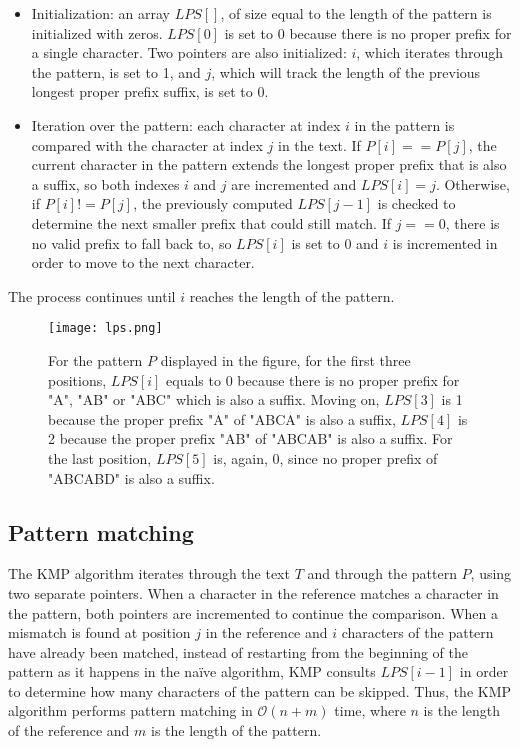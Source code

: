 \begin{itemize}
\item Initialization: an array \( LPS[] \), of size equal to the length of the pattern is initialized with zeros. \( LPS[0] \) is set to 0 because there is no proper prefix for a single character. Two pointers are also initialized: \( i \), which iterates through the pattern, is set to 1, and \( j \), which will track the length of the previous longest proper prefix suffix, is set to 0.
\item Iteration over the pattern: each character at index \( i \) in the pattern is compared with the character at index \( j \) in the text. If \( P[i] == P[j] \), the current character in the pattern extends the longest proper prefix that is also a suffix, so both indexes \( i \) and \( j \) are incremented and \( LPS[i] = j\). Otherwise, if \( P[i] != P[j] \), the previously computed \( LPS[j-1] \) is checked to determine the next smaller prefix that could still match. If \( j == 0 \), there is no valid prefix to fall back to, so \( LPS[i] \) is set to 0 and \( i \) is incremented in order to move to the next character. 
\end{itemize}

The process continues until \( i\) reaches the length of the pattern.

\begin{figure}[h]

  \centering
    \texttt{[image: lps.png]}

  \caption{For the pattern \( P \) displayed in the figure, for the first three positions, \( LPS[i] \) equals to 0 because there is no proper prefix for "A", "AB" or "ABC" which is also a suffix. Moving on, \( LPS[3] \) is 1 because the proper prefix "A" of "ABCA" is also a suffix, \( LPS[4] \) is 2 because the proper prefix "AB" of "ABCAB" is also a suffix. For the last position, \( LPS[5] \) is, again, 0, since no proper prefix of "ABCABD" is also a suffix.}
  \label{fig:lps}
\end{figure}

\subsection{Pattern matching}

The KMP algorithm iterates through the text \( T \) and through the pattern \( P \), using two separate pointers. When a character in the reference matches a character in the pattern, both pointers are incremented to continue the comparison. 
When a mismatch is found at position  \( j \) in the reference and \( i \) characters of the pattern have already been matched, instead of restarting from the beginning of the pattern as it happens in the naïve algorithm, KMP consults \( LPS[i-1] \) in order to determine how many characters of the pattern can be skipped. Thus, the KMP algorithm performs pattern matching in $\mathcal{O}(n + m)$ time, where \( n \) is the length of the reference and \( m \) is the length of the pattern.

